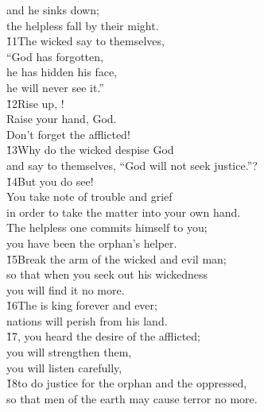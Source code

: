 \begin{poetry}
\poemll    and he sinks down; \\
\poemlll       the helpless fall by their might. \\
\poeml \v{11}The wicked say to themselves, \\
\poemll    ``God has forgotten, \\
\poeml he has hidden his face, \\
\poemll    he will never see it.'' \\
\poeml \v{12}Rise up, ! \\
\poemll    Raise your hand, God. \\
\poemlll       Don't forget the afflicted! \\
\poeml \v{13}Why do the wicked despise God \\
\poemll    and say to themselves, ``God will not seek justice.''? \\
\poeml \v{14}But you do see! \\
\poemll    You take note of trouble and grief \\
\poemlll       in order to take the matter into your own hand. \\
\poeml The helpless one commits himself to you; \\
\poemll    you have been the orphan's helper. \\
\poeml \v{15}Break the arm of the wicked and evil man; \\
\poemll    so that when you seek out his wickedness \\
\poemlll       you will find it no more. \\
\poeml \v{16}The  is king forever and ever; \\
\poemll    nations will perish from his land. \\
\poeml \v{17}, you heard the desire of the afflicted; \\
\poemll    you will strengthen them, \\
\poemlll       you will listen carefully, \\
\poeml \v{18}to do justice for the orphan and the oppressed, \\
\poemll    so that men of the earth may cause terror no more.
\end{poetry}

